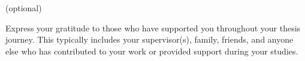 
(optional)

Express your gratitude to those who have supported you throughout your thesis journey. This typically includes your supervisor(s), family, friends, and anyone else who has contributed to your work or provided support during your studies.